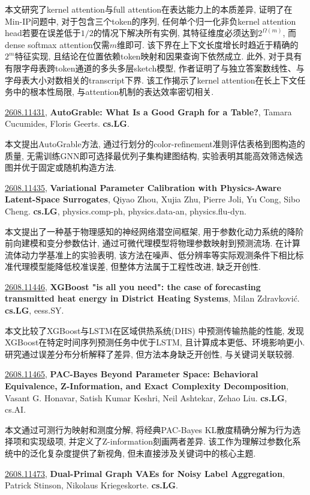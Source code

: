 \documentclass[9pt, a4paper]{article}
\theoremstyle{plain}
\theoremstyle{definition}
\theoremstyle{remark}
\newcommand{\arxivwithtarget}[3]{\hypertarget{#1}{}\href{https://arxiv.org/abs/#1}{#1}, \textbf{\textcolor{arxivblue}{#2}}, #3. }
\begin{document}
本文研究了kernel attention与full attention在表达能力上的本质差异, 证明了在Min-IP问题中, 对于包含三个token的序列, 任何单个归一化非负kernel attention head若要在误差低于$1/2$的情况下解决所有实例, 其特征维度必须达到$2^{\Omega(m)}$, 而dense softmax attention仅需$m$维即可. 该下界在上下文长度增长时趋近于精确的$2^m$特征实现, 且结论在位置依赖token映射和因果查询下依然成立. 此外, 对于具有有限字母表跨token通道的多头多层sketch模型, 作者证明了与独立答案数线性、与字母表大小对数相关的transcript下界. 该工作揭示了kernel attention在长上下文任务中的根本性局限, 与attention机制的表达效率密切相关.


\arxivwithtarget{2608.11431}{AutoGrable: What Is a Good Graph for a Table?}{Tamara Cucumides, Floris Geerts}\textbf{cs.LG}.

本文提出AutoGrable方法, 通过行划分的color-refinement准则评估表格到图构造的质量, 无需训练GNN即可选择最优列子集构建图结构, 实验表明其能高效筛选候选图并优于固定或随机构造方法.


\arxivwithtarget{2608.11435}{Variational Parameter Calibration with Physics-Aware Latent-Space Surrogates}{Qiyao Zhou, Xujia Zhu, Pierre Joli, Yu Cong, Sibo Cheng}\textbf{cs.LG}, physics.comp-ph, physics.data-an, physics.flu-dyn.

本文提出了一种基于物理感知的神经网络潜空间框架, 用于参数化动力系统的降阶前向建模和变分参数估计, 通过可微代理模型将物理参数映射到预测流场. 在计算流体动力学基准上的实验表明, 该方法在噪声、低分辨率等实际观测条件下相比标准代理模型能降低校准误差, 但整体方法属于工程性改进, 缺乏开创性.


\arxivwithtarget{2608.11446}{XGBoost "is all you need": the case of forecasting transmitted heat energy in District Heating Systems}{Milan Zdravković}\textbf{cs.LG}, eess.SY.

本文比较了XGBoost与LSTM在区域供热系统(DHS) 中预测传输热能的性能, 发现XGBoost在特定时间序列预测任务中优于LSTM, 且计算成本更低、环境影响更小. 研究通过误差分布分析解释了差异, 但方法本身缺乏开创性, 与关键词关联较弱.


\arxivwithtarget{2608.11465}{PAC-Bayes Beyond Parameter Space: Behavioral Equivalence, Z-Information, and Exact Complexity Decomposition}{Vasant G. Honavar, Satish Kumar Keshri, Neil Ashtekar, Zehao Liu}\textbf{cs.LG}, cs.AI.

本文通过可测行为映射和测度分解, 将经典PAC-Bayes KL散度精确分解为行为选择项和实现级项, 并定义了Z-information刻画两者差异. 该工作为理解过参数化系统中的泛化复杂度提供了新视角, 但未直接涉及关键词中的核心主题.


\arxivwithtarget{2608.11473}{Dual-Primal Graph VAEs for Noisy Label Aggregation}{Patrick Stinson, Nikolaus Kriegeskorte}\textbf{cs.LG}.
\end{document}
